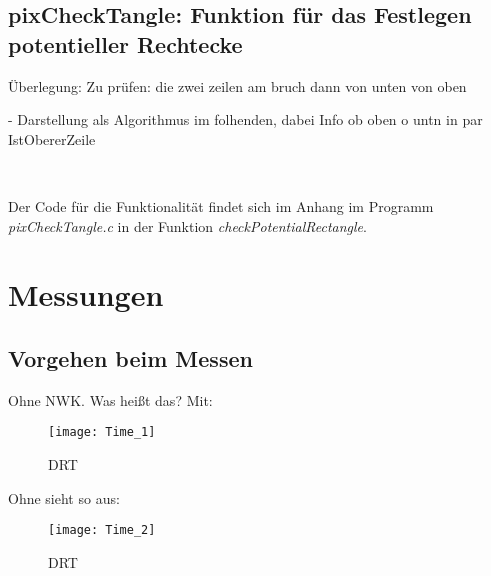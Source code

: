 \documentclass[
10pt, %
a4paper, %
oneside, %
headinclude,footinclude, %
BCOR5mm, %
]{scrartcl}
\begin{document}
\subsection{pixCheckTangle: Funktion für das Festlegen potentieller Rechtecke}

Überlegung: Zu prüfen: die zwei zeilen am bruch
dann von unten von oben 


- Darstellung als Algorithmus im folhenden, dabei Info ob oben o untn in par IstObererZeile

\begin{algorithm}[H]
	
\end{algorithm}\

Der Code für die Funktionalität findet sich im Anhang im Programm \textit{pixCheckTangle.c} in der Funktion \textit{checkPotentialRectangle}.


\section{Messungen}
\subsection{Vorgehen beim Messen}

Ohne NWK. Was heißt das?
Mit:

\begin{figure}[h]
	\centering 
	\texttt{[image: Time\_1]} 
	\caption[DRT]{DRT }
	
\end{figure}

Ohne sieht so aus:

\begin{figure}[h]
	\centering 
	\texttt{[image: Time\_2]} 
	\caption[DRT]{DRT }
	
\end{figure}
\end{document}
